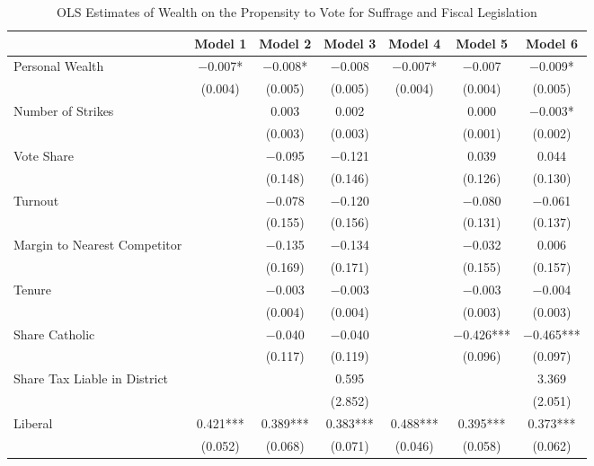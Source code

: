 \begin{table}

\caption{\label{tab:ols_separated}OLS Estimates of Wealth on the Propensity to Vote for Suffrage and Fiscal Legislation}
\centering
\begin{tabular}[t]{lcccccc}
\toprule
  & Model 1 & Model 2 & Model 3 & Model 4 & Model 5 & Model 6\\
\midrule
Personal Wealth & \num{-0.007}* & \num{-0.008}* & \num{-0.008} & \num{-0.007}* & \num{-0.007} & \num{-0.009}*\\
 & (\num{0.004}) & (\num{0.005}) & (\num{0.005}) & (\num{0.004}) & (\num{0.004}) & (\num{0.005})\\
Number of Strikes &  & \num{0.003} & \num{0.002} &  & \num{0.000} & \num{-0.003}*\\
 &  & (\num{0.003}) & (\num{0.003}) &  & (\num{0.001}) & (\num{0.002})\\
Vote Share &  & \num{-0.095} & \num{-0.121} &  & \num{0.039} & \num{0.044}\\
 &  & (\num{0.148}) & (\num{0.146}) &  & (\num{0.126}) & (\num{0.130})\\
Turnout &  & \num{-0.078} & \num{-0.120} &  & \num{-0.080} & \num{-0.061}\\
 &  & (\num{0.155}) & (\num{0.156}) &  & (\num{0.131}) & (\num{0.137})\\
Margin to Nearest Competitor &  & \num{-0.135} & \num{-0.134} &  & \num{-0.032} & \num{0.006}\\
 &  & (\num{0.169}) & (\num{0.171}) &  & (\num{0.155}) & (\num{0.157})\\
Tenure &  & \num{-0.003} & \num{-0.003} &  & \num{-0.003} & \num{-0.004}\\
 &  & (\num{0.004}) & (\num{0.004}) &  & (\num{0.003}) & (\num{0.003})\\
Share Catholic &  & \num{-0.040} & \num{-0.040} &  & \num{-0.426}*** & \num{-0.465}***\\
 &  & (\num{0.117}) & (\num{0.119}) &  & (\num{0.096}) & (\num{0.097})\\
Share Tax Liable in District &  &  & \num{0.595} &  &  & \num{3.369}\\
 &  &  & (\num{2.852}) &  &  & (\num{2.051})\\
Liberal & \num{0.421}*** & \num{0.389}*** & \num{0.383}*** & \num{0.488}*** & \num{0.395}*** & \num{0.373}***\\
 & (\num{0.052}) & (\num{0.068}) & (\num{0.071}) & (\num{0.046}) & (\num{0.058}) & (\num{0.062})\\

\end{tabular}
\end{table}
